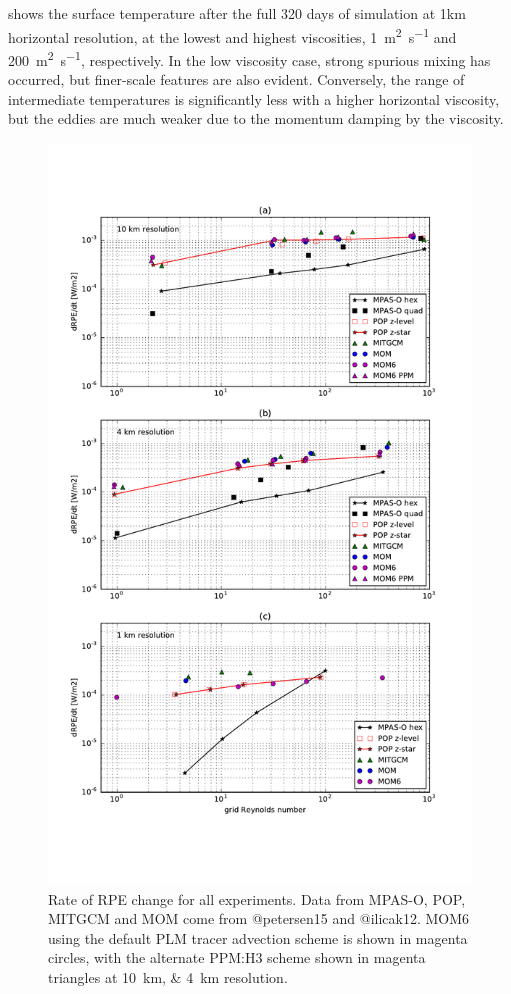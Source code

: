  shows the surface temperature after the full 320 days of simulation at 1km horizontal resolution, at the lowest and highest viscosities, \SI{1}{\square\metre\per\second} and \SI{200}{\square\metre\per\second}, respectively. In the low viscosity case, strong spurious mixing has occurred, but finer-scale features are also evident. Conversely, the range of intermediate temperatures is significantly less with a higher horizontal viscosity, but the eddies are much weaker due to the momentum damping by the viscosity.

\begin{figure}
  \includegraphics{../plots/eddies_drpe.pdf}
  \caption{\label{fig:eddies-drpe} Rate of RPE change for all experiments. Data from MPAS-O, POP, MITGCM and MOM come from @petersen15 and @ilicak12. MOM6 using the default PLM tracer advection scheme is shown in magenta circles, with the alternate PPM:H3 scheme shown in magenta triangles at \SIlist{10;4}{\kilo\metre} resolution.}
\end{figure}

